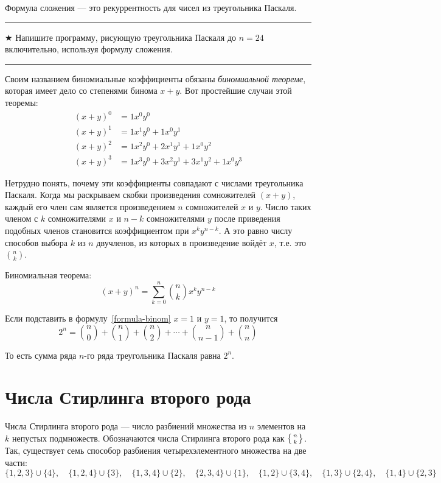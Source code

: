 \documentclass[14pt]{book}
\newenvironment{task}
 { \vspace{2ex}\hrule\vspace{2ex}$\bigstar$ }
 { \vspace{2ex}\hrule\vspace{2ex} }
\newcommand{\stirling}[2]{\left\{{#1}\atop{#2}\right\}}
\begin{document}
Формула сложения --- это рекуррентность для чисел из треугольника Паскаля.

\begin{task}
Напишите программу, рисующую треугольника Паскаля до $n=24$ включительно,
используя формулу сложения.
\end{task}

Своим названием биномиальные коэффициенты обязаны \emph{биномиальной теореме}, которая
имеет дело со степенями бинома $x+y$. Вот простейшие случаи этой теоремы:
\begin{align*}
(x+y)^0 &= 1x^0y^0 \\
(x+y)^1 &= 1x^1y^0 + 1x^0y^1 \\
(x+y)^2 &= 1x^2y^0 + 2x^1y^1 + 1x^0y^2 \\
(x+y)^3 &= 1x^3y^0 + 3x^2y^1 + 3x^1y^2 + 1x^0y^3
\end{align*}

Нетрудно понять, почему эти коэффициенты совпадают с числами треугольника Паскаля.
Когда мы раскрываем скобки произведения сомножителей $(x+y)$,
каждый его член сам является произведением $n$ сомножителей $x$ и $y$.
Число таких членом с $k$ сомножителями $x$ и $n-k$ сомножителями $y$ после приведения
подобных членов становится коэффициентом при $x^ky^{n-k}$. А это равно числу
способов выбора $k$ из $n$ двучленов, из которых в произведение войдёт $x$,
т.е. это $\binom{n}{k}$.

Биномиальная теорема:
\begin{equation}
\label{formula-binom}
(x+y)^n = \sum_{k=0}^{n}\binom{n}{k}x^ky^{n-k}
\end{equation}

Если подставить в формулу~\ref{formula-binom} $x=1$ и $y=1$, то получится
\begin{equation}
2^n = \binom{n}{0} + \binom{n}{1} + \binom{n}{2} + \cdots + \binom{n}{n-1} + \binom{n}{n}
\end{equation}

То есть сумма ряда $n$-го ряда треугольника Паскаля равна $2^n$.

\section{Числа Стирлинга второго рода}

Числа Стирлинга второго рода --- число разбиений множества из $n$ элементов на $k$
непустых подмножеств. Обозначаются числа Стирлинга второго рода как $\stirling{n}{k}$.
Так, существует семь способор разбиения четырехэлементного множества на две части:
$$
  \{1,2,3\}\cup\{4\}, \quad \{1,2,4\}\cup\{3\}, \quad \{1,3,4\}\cup\{2\}, \quad \{2,3,4\}\cup\{1\},
  \quad \{1,2\}\cup\{3,4\}, \quad \{1,3\}\cup\{2,4\}, \quad \{1,4\}\cup\{2,3\}
$$
\end{document}
